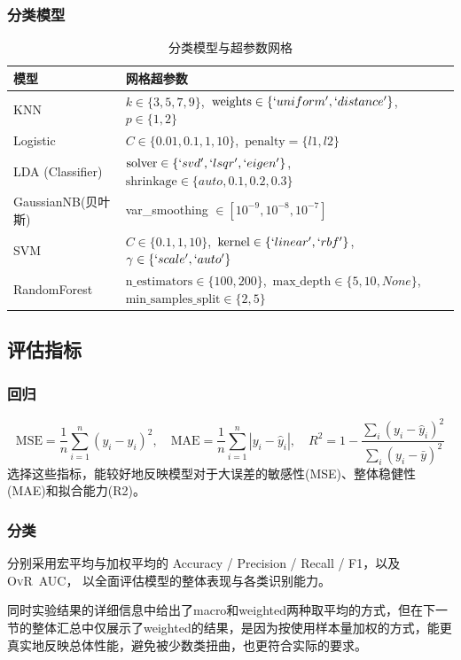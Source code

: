 \documentclass[10pt]{article}
\begin{document}
\subsubsection{分类模型}
\begin{table}[H]\centering
  \caption{分类模型与超参数网格}
  \begin{tabular}{ll}
    \toprule
    模型 & 网格超参数 \\ \midrule
    KNN & $k\in\{3,5,7,9\}$,\ $\text{weights}\in \{`uniform',`distance'\}$,\ $p\in\{1,2\}$ \\
    Logistic & $C\in\{0.01,0.1,1,10\}$,\  $\text{penalty} = \{l1,l2\}$ \\
    LDA (Classifier) & $\text{solver}\in\{`svd',`lsqr',`eigen'\}$,\ $\text{shrinkage}\in\{auto,0.1,0.2,0.3\}$ \\
    GaussianNB(贝叶斯) & var\_smoothing $\in[10^{-9},10^{-8},10^{-7}]$ \\
    SVM & $C\in\{0.1,1,10\}$,\ $\text{kernel}\in\{`linear',`rbf'\}$,\ $\gamma \in \{`scale',`auto'\}$ \\
    RandomForest & $\text{n\_estimators}\in\{100,200\}$,\  $\text{max\_depth}\in\{5,10,None\}$,\  $\text{min\_samples\_split}\in\{2,5\}$ \\
    \bottomrule
  \end{tabular}
\end{table}

\subsection{评估指标}
\subsubsection*{回归}
\begin{equation}
  \text{MSE} = \frac{1}{n}\sum_{i=1}^{n}(y_i - \hat{y}_i)^2,\quad
  \text{MAE} = \frac{1}{n}\sum_{i=1}^{n}|y_i - \hat{y}_i|, \quad
  R^2 = 1-\frac{\sum_{i}(y_i-\hat{y}_i)^2}{\sum_{i}(y_i-\bar{y})^2}
\end{equation}
选择这些指标，能较好地反映模型对于大误差的敏感性(MSE)、整体稳健性(MAE)和拟合能力(R2)。
\subsubsection*{分类}
分别采用宏平均与加权平均的 Accuracy / Precision / Recall / F1，以及 \textsc{OvR} AUC，
以全面评估模型的整体表现与各类识别能力。

同时实验结果的详细信息中给出了macro和weighted两种取平均的方式，但在下一节的整体汇总中仅展示了weighted的结果，是因为按使用样本量加权的方式，能更真实地反映总体性能，避免被少数类扭曲，也更符合实际的要求。
\end{document}
